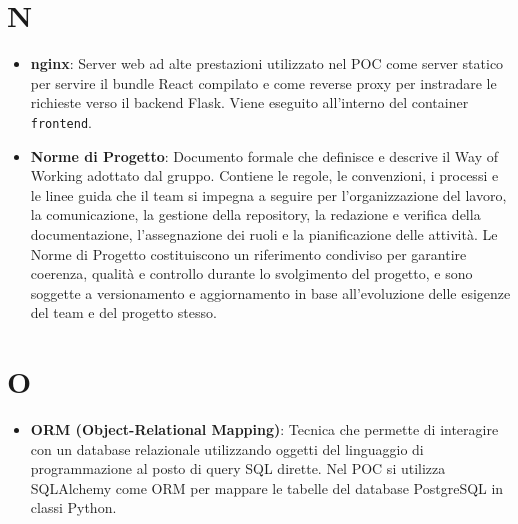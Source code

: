 \documentclass[11pt,a4paper]{article}
\begin{document}
\section*{N}
\begin{itemize}
\item \textbf{nginx}: Server web ad alte prestazioni utilizzato nel POC come server statico per servire il bundle React compilato e come reverse proxy per instradare le richieste verso il backend Flask. Viene eseguito all'interno del container \texttt{frontend}.

\item \textbf{Norme di Progetto}: Documento formale che definisce e descrive il Way of Working adottato dal gruppo. Contiene le regole, le convenzioni, i processi e le linee guida che il team si impegna a seguire per l’organizzazione del lavoro, la comunicazione, la gestione della repository, la redazione e verifica della documentazione, l’assegnazione dei ruoli e la pianificazione delle attività. Le Norme di Progetto costituiscono un riferimento condiviso per garantire coerenza, qualità e controllo durante lo svolgimento del progetto, e sono soggette a versionamento e aggiornamento in base all’evoluzione delle esigenze del team e del progetto stesso.

\end{itemize}

\newpage

\section*{O}
\begin{itemize}
\item \textbf{ORM (Object-Relational Mapping)}: Tecnica che permette di interagire con un database relazionale utilizzando oggetti del linguaggio di programmazione al posto di query SQL dirette. Nel POC si utilizza SQLAlchemy come ORM per mappare le tabelle del database PostgreSQL in classi Python.
\end{itemize}

\newpage
\end{document}
